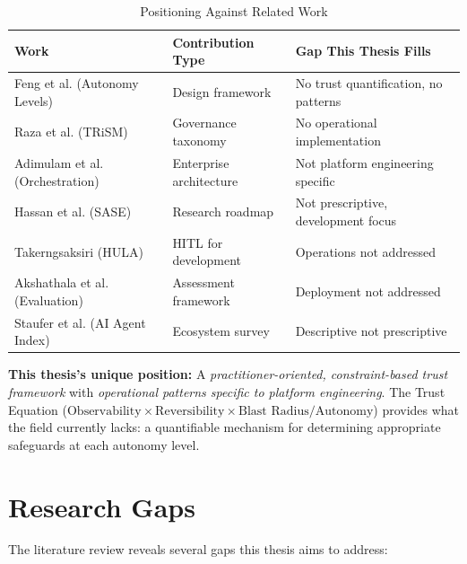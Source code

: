 \begin{table}[htbp]
\centering
\caption{Positioning Against Related Work}
\label{tab:related-work-positioning}
\begin{tabular}{lll}
\toprule
\textbf{Work} & \textbf{Contribution Type} & \textbf{Gap This Thesis Fills} \\
\midrule
Feng et al. (Autonomy Levels) & Design framework & No trust quantification, no patterns \\
Raza et al. (TRiSM) & Governance taxonomy & No operational implementation \\
Adimulam et al. (Orchestration) & Enterprise architecture & Not platform engineering specific \\
Hassan et al. (SASE) & Research roadmap & Not prescriptive, development focus \\
Takerngsaksiri (HULA) & HITL for development & Operations not addressed \\
Akshathala et al. (Evaluation) & Assessment framework & Deployment not addressed \\
Staufer et al. (AI Agent Index) & Ecosystem survey & Descriptive not prescriptive \\
\bottomrule
\end{tabular}
\end{table}

\textbf{This thesis's unique position:} A \textit{practitioner-oriented, constraint-based trust framework} with \textit{operational patterns specific to platform engineering}. The Trust Equation ($\text{Observability} \times \text{Reversibility} \times \text{Blast Radius} / \text{Autonomy}$) provides what the field currently lacks: a quantifiable mechanism for determining appropriate safeguards at each autonomy level.

\section{Research Gaps}
\label{sec:research-gaps}

The literature review reveals several gaps this thesis aims to address:


